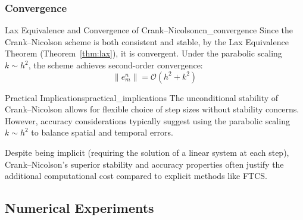 \subsubsection{Convergence}
\begin{theorem}{Lax Equivalence and Convergence of Crank--Nicolson}{cn_convergence}
  Since the Crank--Nicolson scheme is both consistent and stable, by the Lax Equivalence Theorem (Theorem~\ref{thm:lax}), it is convergent. Under the parabolic scaling $k \sim h^2$, the scheme achieves second-order convergence:
  \[
    \|e_m^n\| = \mathcal{O}\!\left(h^2 + k^2\right)
  \]
\end{theorem}

\begin{remark}{Practical Implications}{practical_implications}
  The unconditional stability of Crank--Nicolson allows for flexible choice of step sizes without stability concerns. However, accuracy considerations typically suggest using the parabolic scaling $k \sim h^2$ to balance spatial and temporal errors.

  Despite being implicit (requiring the solution of a linear system at each step), Crank--Nicolson's superior stability and accuracy properties often justify the additional computational cost compared to explicit methods like FTCS.
\end{remark}

\subsection{Numerical Experiments}
